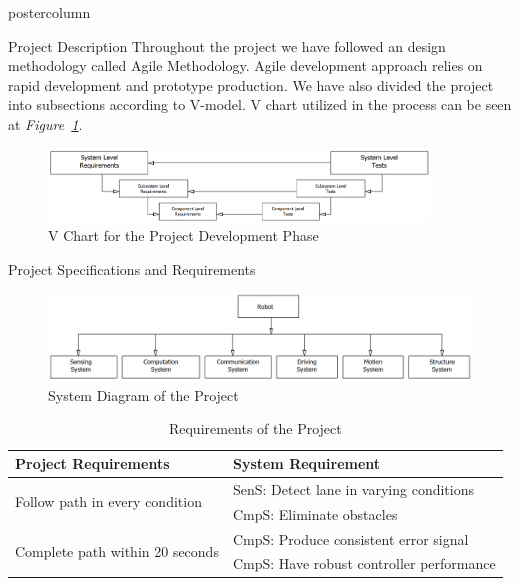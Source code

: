 \documentclass{beamer}
\begin{document}
\begin{frame}
\begin{columns}
\begin{column}{.5\textwidth}
\begin{beamercolorbox}[center]{postercolumn}
\begin{minipage}{.98\textwidth}
{\begin{myblock}{Project Description}
						Throughout the project we have followed an design methodology called Agile Methodology. Agile development approach relies on rapid development and prototype production. We have also divided the project into subsections according to V-model. V chart utilized in the process can be seen at \textit{Figure~\ref{fig:vmodel}}.
						
						\begin{figure}
							\centering
							\includegraphics[width=0.9\textwidth]{img/V-model}
							\caption{V Chart for the Project Development Phase}
							\label{fig:vmodel}
						\end{figure}
						\-\vspace{-2.5cm}
					\end{myblock} 	\vspace{-0.4em}
				\begin{myblock}{Project Specifications and Requirements}
					\begin{figure}
						\centering
						\includegraphics[width=\textwidth]{img/systems}
						\caption{System Diagram of the Project}
						\label{fig:overall-system}
					\end{figure}
				\vspace{-0.1cm}
				\begin{table}
					\caption{Requirements of the Project}
					\begin{tabular}{ll}
						Project Requirements   & System Requirement \\
						\hline 
						\multirow{2}{*}{Follow path in every condition }       &  SenS: Detect lane in varying conditions       \\
						&  CmpS: Eliminate obstacles \\
						\hline
						\multirow{2}{*}{Complete path within 20 seconds}    & CmpS: Produce consistent error signal  \\
						& CmpS: Have robust controller performance  \\

\end{tabular}
\end{table}
\end{myblock}}
\end{minipage}
\end{beamercolorbox}
\end{column}
\end{columns}
\end{frame}
\end{document}
